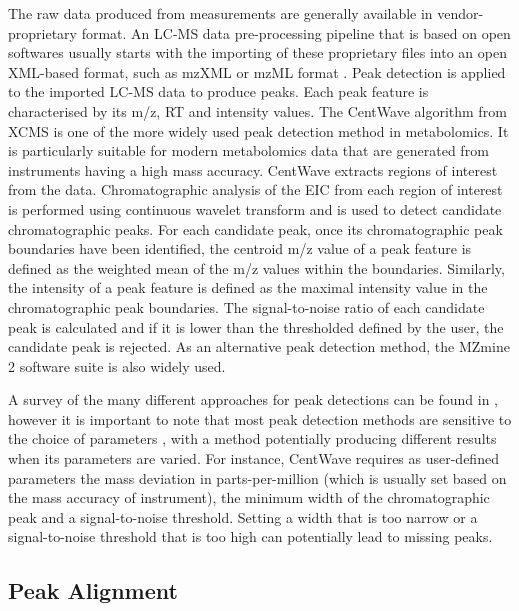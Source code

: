 The raw data produced from measurements are generally available in vendor-proprietary format. An LC-MS data pre-processing pipeline that is based on open softwares usually starts with the importing of these proprietary files into an open XML-based format, such as mzXML \cite{Pedrioli2004} or mzML format \cite{martens2011mzml}. Peak detection is applied to the imported LC-MS data to produce peaks. Each peak feature is characterised by its m/z, RT and intensity values. The CentWave algorithm \cite{Tautenhahn2008} from XCMS is one of the more widely used peak detection method in metabolomics. It is particularly suitable for modern metabolomics data that are generated from instruments having a high mass accuracy. CentWave extracts regions of interest from the data. Chromatographic analysis of the EIC from each region of interest is performed using continuous wavelet transform and is used to detect candidate chromatographic peaks. For each candidate peak, once its chromatographic peak boundaries have been identified, the centroid m/z value of a peak feature is defined as the weighted mean of the m/z values within the boundaries. Similarly, the intensity of a peak feature is defined as the maximal intensity value in the chromatographic peak boundaries. The signal-to-noise ratio of each candidate peak is calculated and if it is lower than the thresholded defined by the user, the candidate peak is rejected. As an alternative peak detection method, the MZmine 2 \cite{Pluskal2010} software suite is also widely used. 

A survey of the many different approaches for peak detections can be found in \cite{Katajamaa2007,Castillo2011,Alonso2015}, however it is important to note that most peak detection methods are sensitive to the choice of parameters \cite{Tautenhahn2008}, with a method potentially producing different results when its parameters are varied. For instance, CentWave requires as user-defined parameters the mass deviation in parts-per-million (which is usually set based on the mass accuracy of instrument), the minimum width of the chromatographic peak and a signal-to-noise threshold. Setting a width that is too narrow or a signal-to-noise threshold that is too high can potentially lead to missing peaks. 

\subsection{Peak Alignment\label{sub:alignment-tools}}


